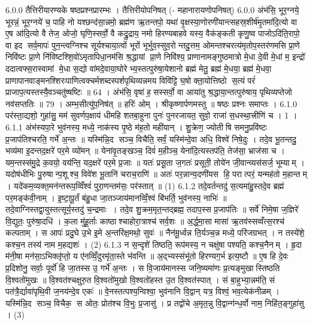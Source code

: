 \setcounter{anuvakam}{0}
6.0.0
तैत्तिरीयारण्यके षष्ठप्रश्नप्रारम्भः । तैत्तिरीयोपनिषत् (- महानारायणोपनिषत्)
6.0.0
अंभ॑सि॒ भूर॒ग्नये॒ भूरन्नं॒ भूर॒ग्नये॑ च॒ पाहि नो यश्छन्द॑सा॒न्नमो॒ ब्रह्म॑ण ऋ॒तन्तपो॒ यथा॑ वृ॒क्षस्या॒णोरणी॑यान्त्सहस्र॒शीर्\mbox{}ष॑मृ॒तमा॑दि॒त्यो वा ए॒ष आ॑दि॒त्यो वै तेज॒ ओजो॒ घृणि॒स्सर्वो॒ वै कद्रु॒द्राय॒ नमो हिरण्यबाहवे यस्य॒ वैक॑ङ्कती कृणु॒ष्व पाजोऽदि॑ति॒रापो॒ वा इद सर्व॒मापः॑ पुन॒न्त्वग्निश्च सूर्यश्चाया॒त्वों भूरों भूर्भुव॒स्सुव॒रोन्तदु॒त्तम॒ ओमन्तश्चरत्य॑मृतोप॒स्तर॑णमसि प्रा॒णे निवि॑ष्टः प्रा॒णे नि॑विष्टश्शि॒वो॑ऽमृतापिधा॒नम॑सि श्र॒द्धायां प्रा॒णे निवि॑श्य॒ प्राणानामङ्गुष्ठमात्रो मे॒धा दे॒वी मे॒धां म॒ इन्द्रो॑ ददात्वफ्स॒रास्वामां मे॒धा स॒द्यो वा॑मदे॒वाया॒घोरेभ्य॒स्तत्पुरु॑षा॒येशानो ब्रह्म॑ मेतु॒ ब्रह्म॑ मे॒धया॒ ब्रह्म॑ मे॒धवा॒ प्राणापानवाङ्मनश्शिरःपाणित्वक्चर्मशब्दस्पर्शपृथिव्यन्नमय विवि॑ट्टि घ॒षोक्ता॒योत्तिष्ठो स॒त्यं परं॑ प्राजाप॒त्यस्तस्यै॒वञ्चतु॑ष्षष्टिः ॥ 64 । अंभ॑सि॒ वृषा॑ ह॒सस्सर्वो॒ वा आया॑तु श्र॒द्धाया॒न्तत्पुरु॑षाय॒ पृथिव्यप्तेजो नव॑सप्ततिः ॥ 79 । अम्भ॒सीत्यु॑प॒निष॑त् ॥ हरिः॑ ओम् । श्रीकृष्णार्पणमस्तु ॥ षष्ठः प्रश्नः समाप्तः ।
6.1.0
पर॑स्ता॒द्यशो॒ गुहा॑सु॒ मम॑ सुवर्णप॒क्षाय॑ धीमहि शतबा॒हुना पुनः॑ पुनरजायत॒ सुवो॒ राजा॑ स॒धस्था॒त्त्रीणि॑ च । 1 ।
6.1.1
अंभ॑स्यपा॒रे भुव॑नस्य॒ मध्ये॒ नाक॑स्य पृ॒ष्ठे म॑ह॒तो मही॑यान् । शु॒क्रेण॒ ज्योतीषि समनु॒प्रवि॑ष्टः प्र॒जाप॑तिश्चरति॒ गर्भे॑ अ॒न्तः ॥ यस्मि॑न्नि॒द सञ्च॒ विचैति॒ सर्वं॒ यस्मि॑न्दे॒वा अधि॒ विश्वे॑ निषे॒दुः । तदे॒व भू॒तन्तदु॒ भव्य॑मा इ॒दन्तद॒क्षरे॑ पर॒मे व्यो॑मन् ॥ येना॑वृ॒तङ्खञ्च॒ दिवं॑ म॒हीञ्च॒ येना॑दि॒त्यस्तप॑ति॒ तेज॑सा॒ भ्राज॑सा च । यम॒न्तस्स॑मु॒द्रे क॒वयो॒ वय॑न्ति॒ यद॒क्षरे॑ पर॒मे प्र॒जाः ॥ यतः॑ प्रसू॒ता ज॒गतः॑ प्रसूती॒ तोये॑न जी॒वान्व्यस॑सर्ज॒ भूम्याम् । यदोष॑धीभिः पु॒रुषान्प॒शूश्च॒ विवे॑श भू॒तानि॑ चराच॒राणि॑ ॥ अतः॑ पर॒न्नान्य॒दणी॑यस हि॒ परात्परं॒ यन्मह॑तो म॒हान्तम् । यदे॑कम॒व्यक्त॒मन॑न्तरूप॒व्विँश्वं॑ पुरा॒णन्तम॑सः॒ पर॑स्तात् ॥ (1)
6.1.2
तदे॒वर्तन्तदु॑ स॒त्यमा॑हु॒स्तदे॒व ब्रह्म॑ पर॒मङ्क॑वी॒नाम् । इ॒ष्टा॒पू॒र्तं ब॑हु॒धा जा॒तञ्जाय॑मानव्विँ॒श्वं बि॑भर्ति॒ भुव॑नस्य॒ नाभिः॑ ॥ तदे॒वाग्निस्तद्वा॒युस्तत्सूर्य॒स्तदु॑ च॒न्द्रमाः । तदे॒व शु॒क्रम॒मृत॒न्तद्ब्रह्म॒ तदाप॒स्स प्र॒जाप॑तिः ॥ सर्वे॑ निमे॒षा ज॒ज्ञिरे॑ वि॒द्युतः॒ पुरु॑षा॒दधि॑ । क॒ला मु॑हू॒र्ताः काष्ठाश्चाहोरा॒त्राश्च॑ सर्व॒शः ॥ अ॒र्द्ध॒मा॒सा मासा॑ ऋ॒तव॑स्सव्वँत्स॒रश्च॑ कल्पताम् । स आपः॑ प्रदु॒घे उ॒भे इ॒मे अ॒न्तरि॑क्ष॒मथो॒ सुवः॑ ॥ नैन॑मू॒र्ध्वन्न ति॒र्यञ्च॒न्न मध्ये॒ परि॑जग्रभत् । न तस्ये॑शे॒ कश्च॒न तस्य॑ नाम म॒हद्यशः॑ । (2)
6.1.3
न स॒न्दृशे॑ तिष्ठति॒ रूप॑मस्य॒ न चक्षु॑षा पश्यति॒ कश्च॒नैनम् । हृ॒दा म॑नी॒षा मन॑सा॒ऽभिक्लृ॑प्तो॒ य ए॑नव्विँ॒दुरमृ॑ता॒स्ते भ॑वन्ति ॥ अ॒द्भ्यस्संभू॑तो हिरण्यग॒र्भ इत्य॒ष्टौ ॥ ए॒ष हि दे॒वः प्र॒दिशोनु॒ सर्वाः॒ पूर्वो॑ हि जा॒तस्स उ॒ गर्भे॑ अ॒न्तः । स वि॒जाय॑मानस्स जनि॒ष्यमा॑णः प्र॒त्यङ्मुखास्तिष्ठति वि॒श्वतो॑मुखः ॥ वि॒श्वत॑श्चक्षुरु॒त वि॒श्वतो॑मुखो वि॒श्वतो॑हस्त उ॒त वि॒श्वत॑स्पात् । सं बा॒हुभ्या॒न्नम॑ति॒ सं पत॑त्रै॒र्द्यावा॑पृथि॒वी ज॒नय॑न्दे॒व एकः॑ ॥ वे॒नस्तत्पश्य॒न्विश्वा॒ भुव॑नानि वि॒द्वान् यत्र॒ विश्वं॒ भव॒त्येक॑नीळम् । यस्मि॑न्नि॒द सञ्च॒ विचैक॒ स ओतः॒ प्रोत॑श्च वि॒भुः प्र॒जासु॑ । प्र तद्वो॑चे अ॒मृत॒न्नु वि॒द्वान्ग॑न्ध॒र्वो नाम॒ निहि॑त॒ङ्गुहा॑सु । (3)
